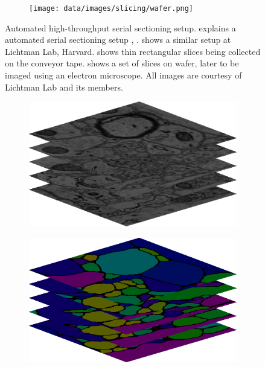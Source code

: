 \begin{figure}[htpb]
	\begin{subfigure}[b]{\mywidth}
		\centering
		\texttt{[image: data/images/slicing/wafer.png]}
		\caption{\label{fig:wafer}}
	\end{subfigure}
	\caption{Automated high-throughput serial sectioning setup.  explains a automated serial sectioning setup \cite{Baena2019}, \cite{Hayworth2006}.  shows a similar setup at Lichtman Lab, Harvard.  shows thin rectangular slices being collected on the conveyor tape.  shows a set of slices on wafer, later to be imaged using an electron microscope. All images are courtesy of Lichtman Lab \cite{LichtmanLab} and its members.}
	\label{fig:emSlicing}
\end{figure}

\begin{figure}[htpb]
	\newcommand{\mywidth}{0.44\textwidth}
	\newcommand{\mywidthlarge}{0.66\textwidth}
	\centering
	\begin{subfigure}[b]{\mywidth}
		\centering
		\includegraphics[width=\textwidth]{data/images/stack/im.png}
		\caption{\label{fig:im_stack}}
	\end{subfigure}
	\hspace{3mm}
	\begin{subfigure}[b]{\mywidth}
		\centering
		\includegraphics[width=\textwidth]{data/images/stack/seg.png}

\end{subfigure}
\end{figure}
